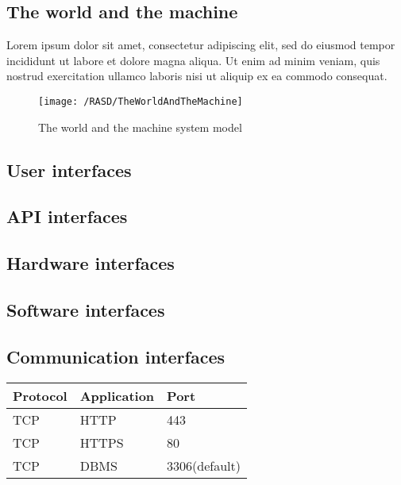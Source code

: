 \subsection{The world and the machine}
Lorem ipsum dolor sit amet, consectetur adipiscing elit, sed do eiusmod tempor incididunt ut labore et dolore magna aliqua. 
Ut enim ad minim veniam, quis nostrud exercitation ullamco laboris nisi ut aliquip ex ea commodo consequat. 
\begin{figure}[!ht]
  \centering
  \vspace{0.2cm}
  \texttt{[image: /RASD/TheWorldAndTheMachine]}\\ 
  \vspace{0.5cm}
  \caption{The world and the machine system model} \label{fig:the_world_and_the_machine} 
\end{figure}

\subsection{User interfaces} %

\subsection{API interfaces}

\subsection{Hardware interfaces}

\subsection{Software interfaces}

\subsection{Communication interfaces}
\begin{tabular}{|l|l|l|}
    \hline
    Protocol & Application & Port \\\hline
    \hline
    TCP & HTTP & 443 \\\hline
    TCP & HTTPS & 80 \\\hline
    TCP & DBMS & 3306(default) \\\hline
\end{tabular}